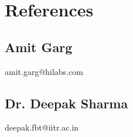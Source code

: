 \documentclass[]{deedy-resume-openfont}
\begin{document}
\begin{minipage}[t]{0.33\textwidth}

\section{References}
\subsection{Amit Garg}
amit.garg@hilabs.com
\sectionsep
\subsection{Dr. Deepak Sharma}
deepak.fbt@iitr.ac.in\\
\sectionsep

%
%

\end{minipage} 
\hfill
\end{document}
